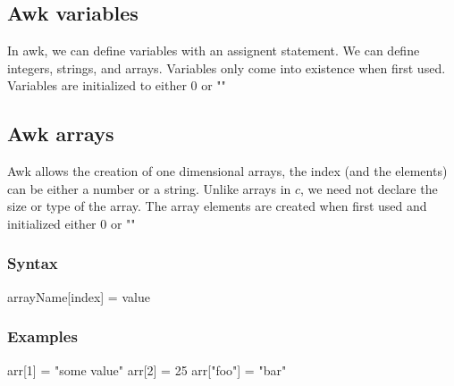 \documentclass{report}
\begin{document}
    \bigbreak \noindent 
    \subsection{Awk variables}
    \bigbreak \noindent 
    In awk, we can define variables with an assignent statement. We can define integers, strings, and arrays. Variables only come into existence when first used. Variables are initialized to either 0 or ""
    \bigbreak \noindent 
    \subsection{Awk arrays}
    \bigbreak \noindent 
    Awk allows the creation of one dimensional arrays, the index (and the elements) can be either a number or a string. Unlike arrays in $c$, we need not declare the size or type of the array. The array elements are created when first used and initialized either 0 or ""
    \bigbreak \noindent 
    \bigbreak \noindent 
    \subsubsection{Syntax}
    \bigbreak \noindent 
    \begin{bashcode}
        arrayName[index] = value
    \end{bashcode}

    \bigbreak \noindent 
    \subsubsection{Examples}
    \bigbreak \noindent 
    \begin{bashcode}
        arr[1] = "some value"
        arr[2] = 25
        arr["foo"] = "bar"
    \end{bashcode}

    \bigbreak \noindent 
\end{document}
